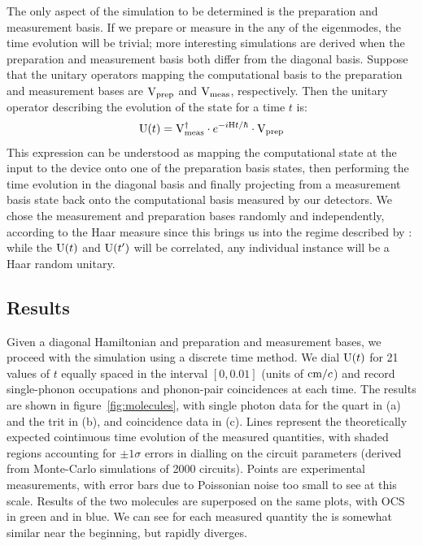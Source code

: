 The only aspect of the simulation to be determined is the preparation and
measurement basis. If we prepare or measure in the any of the eigenmodes, the
time evolution will be trivial; more interesting simulations are derived when
the preparation and measurement basis both differ from the diagonal basis.
Suppose that the unitary
operators mapping the computational basis to the preparation and measurement
bases are \(\mathrm{V}_{\text{prep}}\) and \(\mathrm{V}_{\text{meas}}\), respectively. Then the
unitary operator describing the evolution of
the state for a time \(t\) is:
\begin{equation}
  \mathrm{U} \!\left(t\right) = \mathrm{V}_{\text{meas}}^{\dagger} \cdot e^{-i \mathrm{H} t/\hbar} \cdot
  \mathrm{V}_{\text{prep}}
\end{equation}
This expression can be understood as mapping the computational state at the
input to the device onto one of the preparation basis states, then performing
the time evolution in the diagonal basis and finally projecting from a
measurement basis state back onto the computational basis measured by our
detectors. We chose the measurement and preparation bases randomly and
independently, according to the Haar measure since this brings us into the
regime described by \bosonsampling{}: while the \(\mathrm{U} \!\left(t\right)\) and \(\mathrm{U}
\!\left(t^{\prime}\right) \) will be correlated, any individual instance will be a Haar
random unitary.

\subsection{Results}
Given a diagonal Hamiltonian and preparation and measurement bases, we proceed
with the simulation using a discrete time method. We dial \(\mathrm{U} \!\left(t\right)\) for
21 values of \(t\) equally spaced in the interval \(\left[0,0.01\right]\)
(units of \(\text{cm} / c\)) and record single-phonon occupations and
phonon-pair coincidences at each time. The results are shown in
figure~\ref{fig:molecules}, with single photon data for the quart in (a) and the
trit in (b), and coincidence data in (c). Lines represent the theoretically
expected cointinuous time evolution of the measured quantities, with shaded
regions accounting for \(\pm 1 \sigma\) errors in dialling on the circuit
parameters (derived from Monte-Carlo simulations of 2000 circuits). Points are
experimental measurements, with error bars due to Poissonian noise too small to
see at this scale. Results of the two molecules are superposed on the same
plots, with OCS in green and \co in blue. We can see for each measured quantity
the is somewhat similar near the beginning, but rapidly diverges.

